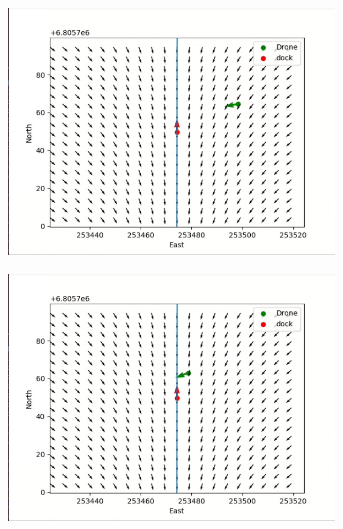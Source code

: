 \documentclass[12pt]{report}
\begin{document}
\begin{figure}[H]
  \begin{subfigure}{0.45\textwidth}
    \centering
    \includegraphics[width=0.95\textwidth]{imgs/drone_exp1_3.png}
    \caption{}
  \end{subfigure}
  \begin{subfigure}{0.45\textwidth}
    \centering
    \includegraphics[width=0.95\textwidth]{imgs/drone_exp1_4.png}
    \caption{}
  \end{subfigure}


\end{figure}
\end{document}
